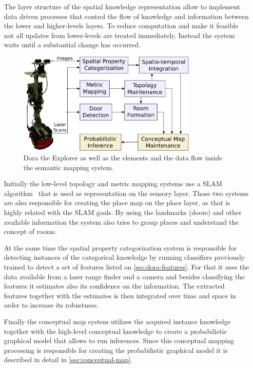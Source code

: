 The layer structure of the spatial knowledge representation allow to implement
data driven processes that control the flow of knowledge and information between the
lower and higher\hyp{}levels layers. To reduce computation and make it feasible not
all updates from lower\hyp{}levels are treated immediately. Instead the system waits
until a substantial change has occurred.

\begin{figure}[h]
\centering
\includegraphics[width=0.8\textwidth]{figures/dora-architecture.pdf}
\caption{\label{fig:dora-architecture}Dora the Explorer as well as the elements and the data flow inside
         the semantic mapping system.}
\end{figure}

Initially the low-level topology and metric mapping systems use a \gls{SLAM} algorithm~\cite{Folkesson07a}
that is used as representation on the sensory layer. Those two systems are also responsible
for creating the place map on the place layer, as that is highly related with the \gls{SLAM} goals.
By using the landmarks (doors) and other available information the system also tries to
group places and understand the concept of rooms.

At the same time the spatial property categorization system is responsible for detecting
instances of the categorical knowledge by running classifiers previously trained to detect
a set of features listed on \autoref{sec:dora-features}. For that it uses the data available
from a laser range finder and a camera and besides classifying the features it estimates also
its confidence on the information.
The extracted features together with the estimates is then integrated over time and space
in order to increase its robustness.

Finally the conceptual map system utilizes the acquired instance knowledge together with
the high\hyp{}level conceptual knowledge to create a probabilistic graphical model that allows
to run inferences.
Since this conceptual mapping processing is responsible for creating the probabilistic
graphical model it is described in detail in \autoref{sec:conceptual-map}.


